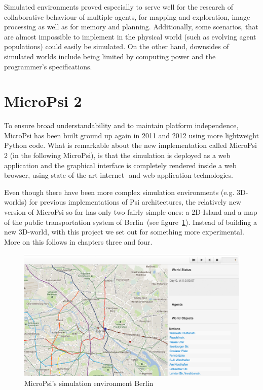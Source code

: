 Simulated environments proved especially to serve well for the research of collaborative behaviour of multiple agents, for mapping and exploration, image processing as well as for memory and planning. Additionally, some scenarios, that are almost impossible to implement in the physical world (such as evolving agent populations) could easily be simulated. On the other hand, downsides of simulated worlds include being limited by computing power and the programmer's specifications.~\cite{Bach:2009:PSI:1611304}

    \section{MicroPsi 2}
To ensure broad understandability and to maintain platform independence, MicroPsi has been built ground up again in 2011 and 2012 using more lightweight Python code. What is remarkable about the new implementation called MicroPsi 2 (in the following MicroPsi), is that the simulation is deployed as a web application and the graphical interface is completely rendered inside a web browser, using state-of-the-art internet- and web application technologies.~\cite{conf/agi/Bach12}
        
Even though there have been more complex simulation environments (e.g. 3D-worlds) for previous implementations of Psi architectures, the relatively new version of MicroPsi so far has only two fairly simple ones: a 2D-Island and a map of the public transportation system of Berlin~(see figure~\ref{mp2_berlin}). Instead of building a new 3D-world, with this project we set out for something more experimental. More on this follows in chapters three and four.

\begin{figure}[h]
  \centering
    \includegraphics[width=14cm]{graphics/mp2_berlin}
  \caption{MicroPsi's simulation environment Berlin}
  \label{mp2_berlin}
\end{figure}

